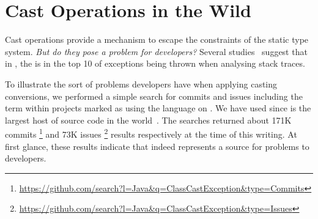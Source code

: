 
\chapter{Cast Operations in the Wild}
\label{cha:casts}

Cast operations provide a mechanism to escape the constraints of the static type system.
\emph{But do they pose a problem for developers?}
Several studies~\citep{kechagiaUndocumentedUncheckedExceptions2014,coelhoUnveilingExceptionHandling2015,zhitnitskyTop10Exception2016}
suggest that in \java{},
%
%
the  is in the top 10 of exceptions being thrown when analysing stack traces.

To illustrate the sort of problems developers have when applying casting conversions,
%
%
we performed a simple search for commits and issues including the term  within projects marked as using the \java{} language on \github{}.
We have used \github{} since is the largest host of source code in the world~\citep{gousiosLeanGHTorrentGitHub2014}.
The searches returned about 171K commits%
\footnote{\url{https://github.com/search?l=Java&q=ClassCastException&type=Commits}}
and 73K issues%
\footnote{\url{https://github.com/search?l=Java&q=ClassCastException&type=Issues}}
%
%
results respectively at the time of this writing.
At first glance, these results indicate that  indeed represents a source for problems to developers.







